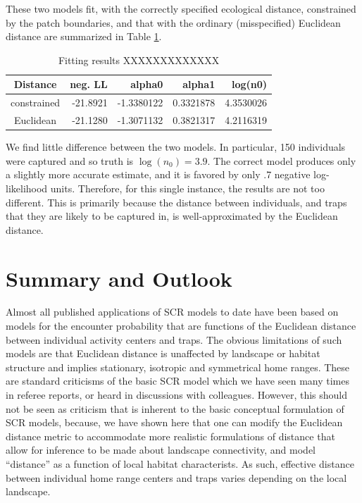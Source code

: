These two models fit, with the correctly specified ecological
distance, constrained by the patch boundaries, and that with the
ordinary (misspecified) Euclidean distance are summarized in Table \ref{rsf.tab.fakecorridor}.
\begin{table}
\centering
\caption{Fitting results XXXXXXXXXXXXX}
\begin{tabular}{crrrr}
Distance    &  neg. LL &    alpha0   & alpha1    &log(n0) \\ \hline
constrained & -21.8921 &  -1.3380122 & 0.3321878 & 4.3530026 \\
Euclidean   & -21.1280 &  -1.3071132 & 0.3821317 & 4.2116319 \\
\end{tabular}
\label{rsf.tab.fakecorridor}
\end{table}
We find little difference between the two models. In
particular, 150 individuals were captured and so truth is $\log(n_{0}) = 3.9$.
The correct model produces only a slightly more accurate  estimate, and
it is favored by only .7 negative log-likelihood units.
Therefore, for this single instance, the results are not too different.
This is primarily because
 the distance between individuals, and traps that they are likely
to be captured in, is well-approximated by the Euclidean distance.




\section{Summary and Outlook}


Almost
all published applications of SCR models to date have been based on
models for the encounter probability that are functions of the
Euclidean distance between individual activity centers and traps. The
obvious limitations of such models are that Euclidean
distance is unaffected by landscape or habitat
structure and implies stationary, isotropic and symmetrical home
ranges. These are standard criticisms of the basic SCR model which we
have seen many times in referee reports, or heard in discussions with
colleagues.
However, this should not be seen as criticism
that is inherent to the basic conceptual formulation of SCR models, because,
we have shown here that
one can modify the Euclidean distance metric
to accommodate more realistic
formulations of distance that allow for inference to be made about
landscape connectivity, and model ``distance'' as a function of
local habitat characterists. As such, effective distance between individual home
range centers and traps varies depending on the local landscape.

